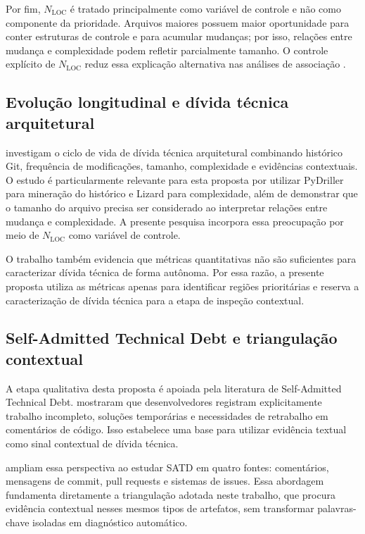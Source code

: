 \documentclass[12pt]{article}
\newcommand{\NLOC}{\ensuremath{N_{\mathrm{LOC}}}}
\begin{document}
Por fim, \NLOC{} é tratado principalmente como variável de controle e não como componente da prioridade. Arquivos maiores possuem maior oportunidade para conter estruturas de controle e para acumular mudanças; por isso, relações entre mudança e complexidade podem refletir parcialmente tamanho. O controle explícito de \NLOC{} reduz essa explicação alternativa nas análises de associação \cite{nagappan2005churn,sutoyo2025tracing}.

\subsection{Evolução longitudinal e dívida técnica arquitetural}

\cite{sutoyo2025tracing} investigam o ciclo de vida de dívida técnica arquitetural combinando histórico Git, frequência de modificações, tamanho, complexidade e evidências contextuais. O estudo é particularmente relevante para esta proposta por utilizar PyDriller para mineração do histórico e Lizard para complexidade, além de demonstrar que o tamanho do arquivo precisa ser considerado ao interpretar relações entre mudança e complexidade. A presente pesquisa incorpora essa preocupação por meio de \NLOC{} como variável de controle.

O trabalho também evidencia que métricas quantitativas não são suficientes para caracterizar dívida técnica de forma autônoma. Por essa razão, a presente proposta utiliza as métricas apenas para identificar regiões prioritárias e reserva a caracterização de dívida técnica para a etapa de inspeção contextual.

\subsection{Self-Admitted Technical Debt e triangulação contextual}

A etapa qualitativa desta proposta é apoiada pela literatura de Self-Admitted Technical Debt. \cite{potdar2014satd} mostraram que desenvolvedores registram explicitamente trabalho incompleto, soluções temporárias e necessidades de retrabalho em comentários de código. Isso estabelece uma base para utilizar evidência textual como sinal contextual de dívida técnica.

\cite{li2023satd} ampliam essa perspectiva ao estudar SATD em quatro fontes: comentários, mensagens de commit, pull requests e sistemas de issues. Essa abordagem fundamenta diretamente a triangulação adotada neste trabalho, que procura evidência contextual nesses mesmos tipos de artefatos, sem transformar palavras-chave isoladas em diagnóstico automático.
\end{document}
